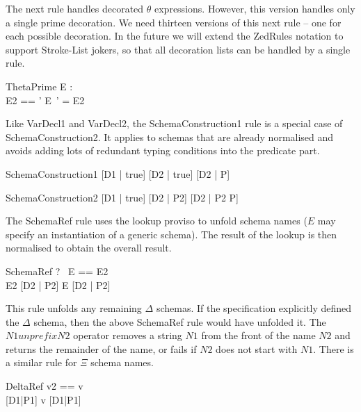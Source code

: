 \documentclass{entcs}
\newcommand{\sexprUnfoldsTo}{\mathrel{=_{se}}}
\newcommand{\declListUnfoldsTo}{\mathrel{=_d}}
\newcommand{\unprefix}{\mathrel{unprefix}}
\begin{document}
The next rule handles decorated $\theta$ expressions.  However, this
version handles only a single prime decoration.  We need thirteen
versions of this next rule -- one for 
each possible decoration.   In the future we will extend the ZedRules
notation to support Stroke-List jokers, so that all decoration lists can
be handled by a single rule.

\begin{zedrule}{ThetaPrime}
  \proviso E : \power [D] \\
  \proviso E2 == \theta [D | true] '
\derives
  \theta E~' = E2
\end{zedrule}

Like VarDecl1 and VarDecl2, the SchemaConstruction1 rule is a special
case of SchemaConstruction2.  It applies to schemas that are already
normalised and avoids adding lots of redundant typing conditions into
the predicate part.
\begin{zedrule}{SchemaConstruction1}
  [D1 | true] \declListUnfoldsTo [D2 | true]
\derives
  [D1 | P] \sexprUnfoldsTo [D2 | P]
\end{zedrule}

\begin{zedrule}{SchemaConstruction2}
  [D1 | true] \declListUnfoldsTo [D2 | P2]
\derives
  [D1 | P] \sexprUnfoldsTo [D2 | P2 \land P]
\end{zedrule}

The SchemaRef rule uses the lookup proviso to unfold schema names
($E$ may specify an instantiation of a generic schema).  
The result of the lookup
is then normalised to obtain the overall result.
\begin{zedrule}{SchemaRef}
  \proviso ?~ E == E2 \\
  E2 \sexprUnfoldsTo [D2 | P2]
\derives
  E \sexprUnfoldsTo [D2 | P2]
\end{zedrule}

This rule unfolds any remaining $\Delta$ schemas.
If the specification explicitly defined the $\Delta$ schema,
then the above SchemaRef rule would have unfolded it.
The $N1 \unprefix N2$ operator removes a string $N1$ from the front of
the name $N2$ and returns the remainder of the name, or fails if $N2$
does not start with $N1$.  There is a similar rule for $\Xi$ schema names. 

\begin{zedrule}{DeltaRef}
  \proviso v2 == \Delta \unprefix v \\
  [v2; v2~'] \sexprUnfoldsTo [D1|P1]
\derives
  v \sexprUnfoldsTo [D1|P1]
\end{zedrule}
\end{document}
